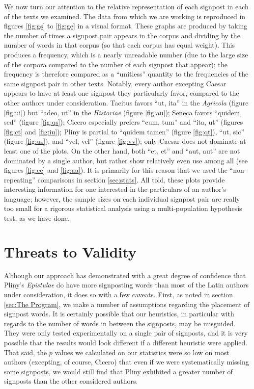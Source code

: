 We now turn our attention to the relative representation of each signpost in each of the texts we examined. The data from which we are working is reproduced in figures \ref{fig:gs} to \ref{fig:ge} in a visual format. These graphs are produced by taking the number of times a signpost pair appears in the corpus and dividing by the number of words in that corpus (so that each corpus has equal weight). This produces a frequency, which is a nearly unreadable number (due to the large size of the corpora compared to the number of each signpost that appear); the frequency is therefore compared as a ``unitless'' quantity to the frequencies of the same signpost pair in other texts. Notably, every author excepting Caesar appears to have at least one signpost they particularly favor, compared to the other authors under consideration. Tacitus favors ``ut, ita'' in the \textit{Agricola} (figure \ref{fig:ui}) but ``adeo, ut'' in the \textit{Historiae} (figure \ref{fig:au}); Seneca favors ``quidem, sed'' (figure \ref{fig:qs}); Cicero especially prefers ``cum, tum'' and ``ita, ut'' (figures \ref{fig:ct} and \ref{fig:iu}); Pliny is partial to ``quidem tamen'' (figure \ref{fig:qt}), ``ut, sic'' (figure \ref{fig:us}), and ``vel, vel'' (figure \ref{fig:vv}); only Caesar does not dominate at least one of the plots. On the other hand, both ``et, et'' and ``aut, aut'' are not dominated by a single author, but rather show relatively even use among all (see figures \ref{fig:ee} and \ref{fig:aa}). It is primarily for this reason that we used the ``non-repeating'' comparisons in section \ref{sec:stats}. All told, these plots provide interesting information for one interested in the particulars of an author's language; however, the sample sizes on each individual signpost pair are really too small for a rigorous statistical analysis using a multi-population hypothesis test, as we have done.  

\section{Threats to Validity}
\label{sec:Threats to Validity}

Although our approach has demonstrated with a great degree of confidence that Pliny's \textit{Epistulae} do have more signposting words than most of the Latin authors under consideration, it does so with a few caveats. First, as noted in section \ref{sec:The Program}, we make a number of assumptions regarding the placement of signpost words. It is certainly possible that our heuristics, in particular with regards to the number of words in between the signposts, may be misguided. They were only tested experimentally on a single pair of signposts, and it is very possible that the results would look different if a different heuristic were applied. That said, the $p$ values we calculated on our statistics were so low on most authors (excepting, of course, Cicero) that even if we were systematically missing some signposts, we would still find that Pliny exhibited a greater number of signposts than the other considered authors.

